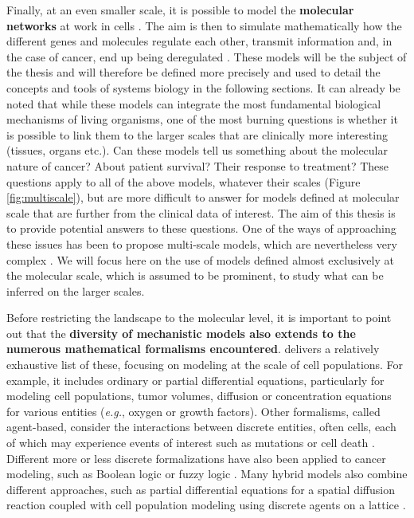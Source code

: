 \documentclass[a4paper,12pt,twoside,onecolumn,openright,final,oldfontcommands]{memoir}
\begin{document}
Finally, at an even smaller scale, it is possible to model the
\textbf{molecular networks} at work in cells \citep{le2015quantitative}.
The aim is then to simulate mathematically how the different genes and
molecules regulate each other, transmit information and, in the case of
cancer, end up being deregulated \citep{calzone2010mathematical}. These
models will be the subject of the thesis and will therefore be defined
more precisely and used to detail the concepts and tools of systems
biology in the following sections. It can already be noted that while
these models can integrate the most fundamental biological mechanisms of
living organisms, one of the most burning questions is whether it is
possible to link them to the larger scales that are clinically more
interesting (tissues, organs etc.). Can these models tell us something
about the molecular nature of cancer? About patient survival? Their
response to treatment? These questions apply to all of the above models,
whatever their scales (Figure \ref{fig:multiscale}), but are more
difficult to answer for models defined at molecular scale that are
further from the clinical data of interest. The aim of this thesis is to
provide potential answers to these questions. One of the ways of
approaching these issues has been to propose multi-scale models, which
are nevertheless very complex
\citep{anderson2008integrative, powathil2015systems}. We will focus here
on the use of models defined almost exclusively at the molecular scale,
which is assumed to be prominent, to study what can be inferred on the
larger scales.

Before restricting the landscape to the molecular level, it is important
to point out that the \textbf{diversity of mechanistic models also
extends to the numerous mathematical formalisms encountered}.
\citet{altrock2015mathematics} delivers a relatively exhaustive list of
these, focusing on modeling at the scale of cell populations. For
example, it includes ordinary or partial differential equations,
particularly for modeling cell populations, tumor volumes, diffusion or
concentration equations for various entities (\emph{e.g.}, oxygen or
growth factors). Other formalisms, called agent-based, consider the
interactions between discrete entities, often cells, each of which may
experience events of interest such as mutations or cell death
\citep{wang2014clonal}. Different more or less discrete formalizations
have also been applied to cancer modeling, such as Boolean logic or
fuzzy logic \citep{le2015quantitative}. Many hybrid models also combine
different approaches, such as partial differential equations for a
spatial diffusion reaction coupled with cell population modeling using
discrete agents on a lattice \citep{altrock2015mathematics}.
\end{document}
